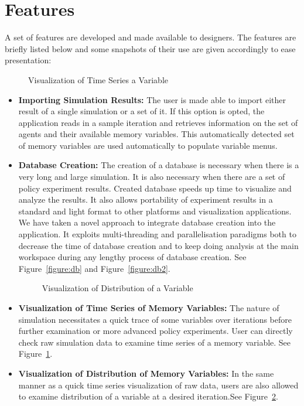\section{Features}
A set of features are developed and made available to designers. The features are briefly listed below and some snapshots of their use are given accordingly to ease presentation:
\begin{figure}[h]
  \centering
{}
  \caption{Visualization of Time Series a Variable}
  \label{figure:visTS}
\end{figure}
\begin{itemize}
\item \textbf{Importing Simulation Results:} The user is made able to import either result of a single simulation or a set of it. If this option is opted, the application reads in a sample iteration and retrieves information on the set of agents and their available memory variables. This automatically detected set of memory variables are used automatically to populate variable menus.
\item \textbf{Database Creation:} The creation of a database is necessary when there is a very long and large simulation. It is also necessary when there are a set of policy experiment results. Created database speeds up time to visualize and analyze the results. It also allows portability of experiment results in a standard and light format to other platforms and visualization applications. We have taken a novel approach to integrate database creation into the application. It exploits multi-threading and parallelisation paradigms both to decrease the time of database creation and to keep doing analysis at the main workspace during any lengthy process of database creation. See Figure~\ref{figure:db} and Figure~\ref{figure:db2}.
\begin{figure}[h]
  \centering
{}
  \caption{Visualization of Distribution of a Variable}
  \label{figure:visdistro}
\end{figure}
\item \textbf{Visualization of Time Series of Memory Variables:} The nature of simulation necessitates a quick trace of some variables over iterations before further examination or more advanced policy experiments. User can directly check raw simulation data to examine time series of a memory variable. See Figure~\ref{figure:visTS}.

\item \textbf{Visualization of Distribution of Memory Variables:} In the same manner as a quick time series visualization of raw data, users are also allowed to examine distribution of a variable at a desired iteration.See Figure~\ref{figure:visdistro}.


\end{itemize}
